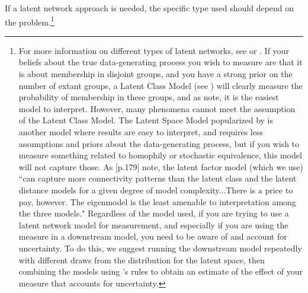 If a latent network approach is needed, the specific type used should depend on the problem.\footnote{For more information on different types of latent networks, see \citet{minhas:etal:2018} or \citet{goldenberg:etal:2010}. If your beliefs about the true data-generating process you wish to measure are that it is about membership in disjoint groups, and you have a strong prior on the number of extant groups, a Latent Class Model (see \citet{airoldi:etal:2008}) will  clearly measure the probability of membership in these groups, and as \citet{goldenberg:etal:2010} note, it is the easiest model to interpret. However, many phenomena cannot meet the assumption of the Latent Class Model. The Latent Space Model popularized by \citet{handcock:etal:2008} is another model where results are easy to interpret, and requires less assumptions and priors about the data-generating process, but if you wish to measure something related to homophily or stochastic equivalence, this model will not capture those.  As \citet{goldenberg:etal:2010}[p.179] note, the latent factor model (which we use) ``can capture more connectivity patterns than the latent class and the latent distance models for a given degree of model complexity...There is a price to pay, however. The eigenmodel is the least amenable to interpretation among the three models." Regardless of the model used, if you are trying to use a latent network model for measurement, and especially if you are using the measure in a downstream model, you need to be aware of and account for uncertainty. To do this, we suggest running the downstream model repeatedly with different draws from the distribution for the latent space, then combining the models using \citet{rubin:1976}'s rules to obtain an estimate of the effect of your measure that accounts for uncertainty.}


